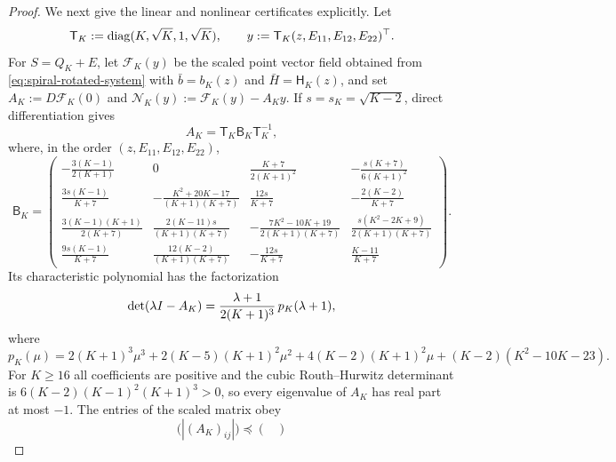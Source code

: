 \begin{proof}
    We next give the linear and nonlinear certificates explicitly. Let
    \begin{equation}\label{eq:spiral-y-scaling}
        \mathsf T_K:=\operatorname{diag}(K,\sqrt K,1,\sqrt K),
        \qquad
        y:=\mathsf T_K(z,E_{11},E_{12},E_{22})^\top .
    \end{equation}
    For $S=Q_K+E$, let $\mathcal F_K(y)$ be the scaled point vector field obtained from
    \eqref{eq:spiral-rotated-system} with $\bar b=b_K(z)$ and $\bar H=\mathsf H_K(z)$, and set
    $A_K:=D\mathcal F_K(0)$ and $\mathcal N_K(y):=\mathcal F_K(y)-A_Ky$. If $s=s_K=\sqrt{K-2}$,
    direct differentiation gives
    \begin{equation}\label{eq:spiral-linear-matrix}
        A_K=\mathsf T_K\mathsf B_K\mathsf T_K^{-1},
    \end{equation}
    where, in the order $(z,E_{11},E_{12},E_{22})$,
    {\scriptsize
    \begin{equation*}
        \mathsf B_K=
        \begin{pmatrix}
        -\frac{3(K-1)}{2(K+1)}&0&\frac{K+7}{2(K+1)^2}&-\frac{s(K+7)}{6(K+1)^2}\\[1mm]
        \frac{3s(K-1)}{K+7}&-\frac{K^2+20K-17}{(K+1)(K+7)}&\frac{12s}{K+7}&-\frac{2(K-2)}{K+7}\\[1mm]
        \frac{3(K-1)(K+1)}{2(K+7)}&\frac{2(K-11)s}{(K+1)(K+7)}&-\frac{7K^2-10K+19}{2(K+1)(K+7)}&\frac{s(K^2-2K+9)}{2(K+1)(K+7)}\\[1mm]
        \frac{9s(K-1)}{K+7}&\frac{12(K-2)}{(K+1)(K+7)}&-\frac{12s}{K+7}&\frac{K-11}{K+7}
        \end{pmatrix}.
    \end{equation*}
    }
    Its characteristic polynomial has the factorization
    \begin{equation}\label{eq:spiral-characteristic}
        \det(\lambda I-A_K)=\frac{\lambda+1}{2(K+1)^3}\,p_K(\lambda+1),
    \end{equation}
    where
    \begin{equation*}
        p_K(\mu)=2(K+1)^3\mu^3+2(K-5)(K+1)^2\mu^2+4(K-2)(K+1)^2\mu+(K-2)(K^2-10K-23).
    \end{equation*}
    For $K\geq16$ all coefficients are positive and the cubic Routh--Hurwitz determinant is
    $6(K-2)(K-1)^2(K+1)^3>0$, so every eigenvalue of $A_K$ has real part at most $-1$. The
    entries of the scaled matrix obey
    \begin{equation*}
        \bigl(|(A_K)_{ij}|\bigr)
        \preceq
        \begin{pmatrix}

\end{pmatrix}
\end{equation*}
\end{proof}
